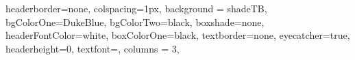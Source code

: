 \documentclass[landscape,paperwidth=1920pt, paperheight = 1080pt,fontscale=0.45,columns=3, margin = 0px]{Poster} %
\begin{document}
\begin{poster}
{
headerborder=none, %
colspacing=1px, %
background = shadeTB,
bgColorOne=DukeBlue, %
bgColorTwo=black, %
boxshade=none,
headerFontColor=white, %
boxColorOne=black, %
textborder=none, %
eyecatcher=true, %
headerheight=0\textheight, %
textfont={\color{white}}, %
columns = 3,
}
%
{}{}{}{}


\end{poster}
\end{document}
